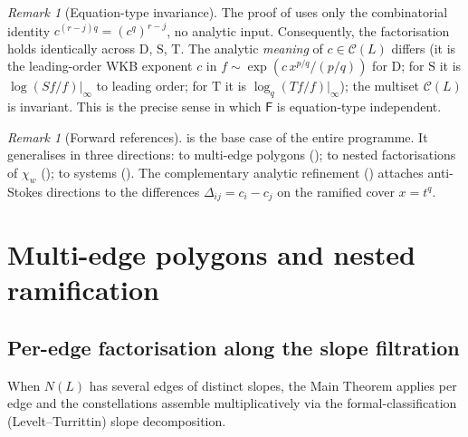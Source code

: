 \documentclass[aip,jmp,preprint,amsmath,amssymb,nofootinbib,floatfix]{revtex4-2}
\theoremstyle{plain}
\theoremstyle{definition}
\theoremstyle{remark}
\newtheorem{remark}[theorem]{Remark}
\newcommand{\opD}{\mathrm{D}}                     %
\newcommand{\opS}{\mathrm{S}}                     %
\newcommand{\opT}{\mathrm{T}}                     %
\newcommand{\Cl}{\mathcal{C}}
\newcommand{\Fclass}{\mathsf{F}}
\newcommand{\Dij}{\Delta_{ij}}
\begin{document}
\begin{remark}[Equation-type invariance]\label{rem:eq-invariance}
The proof of  uses only the combinatorial identity
$c^{(r-j)q} = (c^q)^{r-j}$, no analytic input. Consequently, the
factorisation holds identically across $\opD$, $\opS$, $\opT$. The analytic
\emph{meaning} of $c \in \Cl(L)$ differs (it is the leading-order WKB
exponent $c$ in $f \sim \exp(c\, x^{p/q}/(p/q))$ for $\opD$; for $\opS$ it
is $\log(S f / f)|_\infty$ to leading order; for $\opT$ it is
$\log_q(T f / f)|_\infty$); the multiset $\Cl(L)$ is invariant. This is
the precise sense in which $\Fclass$ is equation-type independent.
\end{remark}

\begin{remark}[Forward references]\label{rem:forward-main}
 is the base case of the entire programme. It generalises
in three directions: to multi-edge polygons (); to nested
factorisations of $\chi_w$ (); to systems ().
The complementary analytic refinement
() attaches anti-Stokes directions
to the differences $\Dij = c_i - c_j$ on the ramified cover $x = t^q$.
\end{remark}


\section{Multi-edge polygons and nested ramification}\label{sec:multiedge}

\subsection{Per-edge factorisation along the slope filtration}\label{ssec:M1}

When $N(L)$ has several edges of distinct slopes, the Main Theorem applies
per edge and the constellations assemble multiplicatively via the
formal-classification (Levelt--Turrittin) slope decomposition.
\end{document}
